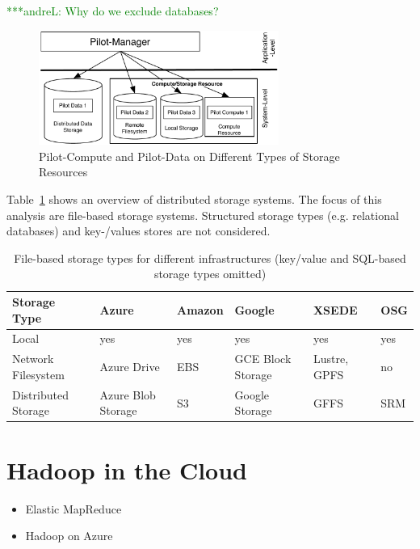 \documentclass[times]{cpeauth}
\newcommand{\alnote}[1]{ {\textcolor{green} { ***andreL: #1 }}}
\newcommand{\alnote}[1]{}
\begin{document}
\alnote{Why do we exclude databases?}

\begin{figure}[t]
	\centering
		\includegraphics[width=0.7\textwidth]{figures/storage-types.pdf}
	\caption{Pilot-Compute and Pilot-Data on Different Types of Storage Resources}
	\label{fig:figures_storage-types}
\end{figure}

Table~\ref{tab:storage-systems} shows an overview of distributed storage 
systems. The focus of this analysis are file-based storage systems. Structured
storage types (e.g. relational databases) and key-/values stores are not 
considered.

\begin{table}[t]
\centering
\begin{tabular}{|p{2cm}|p{1.2cm}|p{1.2cm}|p{1.2cm}|p{1.2cm}|p{1.2cm}|}
	\hline
	\textbf{Storage Type} &\textbf{Azure} &\textbf{Amazon} &\textbf{Google} &\textbf{XSEDE}  &\textbf{OSG} \\
	\hline
	Local	&yes &yes &yes &yes &yes\\
	\hline
	Network Filesystem &Azure Drive &EBS &GCE Block Storage &Lustre, GPFS 
	&no\\
	\hline
	Distributed Storage &Azure Blob Storage &S3 &Google Storage &GFFS
	 &SRM\\
	\hline	
\end{tabular}
\caption{File-based storage types for different infrastructures (key/value and 
SQL-based storage types omitted) \label{tab:storage-systems}}
\end{table}

\section{Hadoop in the Cloud}

\begin{itemize}
	\item Elastic MapReduce
	\item Hadoop on Azure
\end{itemize}
\end{document}
